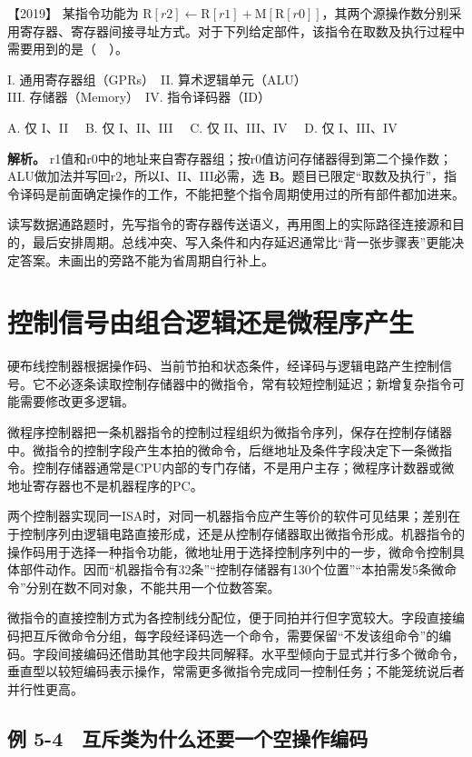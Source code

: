 \noindent{}【2019】 某指令功能为 \(\mathrm R[r2]\leftarrow\mathrm R[r1]+\mathrm M[\mathrm R[r0]]\)，其两个源操作数分别采用寄存器、寄存器间接寻址方式。对于下列给定部件，该指令在取数及执行过程中需要用到的是（　）。

I. 通用寄存器组（GPRs）　II. 算术逻辑单元（ALU）\\
III. 存储器（Memory）　IV. 指令译码器（ID）

A. 仅 I、II　 B. 仅 I、II、III　 C. 仅 II、III、IV　 D. 仅 I、III、IV


\textbf{解析。} r1值和r0中的地址来自寄存器组；按r0值访问存储器得到第二个操作数；ALU做加法并写回r2，所以I、II、III必需，选 \textbf{B}。题目已限定``取数及执行''，指令译码是前面确定操作的工作，不能把整个指令周期使用过的所有部件都加进来。

读写数据通路题时，先写指令的寄存器传送语义，再用图上的实际路径连接源和目的，最后安排周期。总线冲突、写入条件和内存延迟通常比``背一张步骤表''更能决定答案。未画出的旁路不能为省周期自行补上。

\section{控制信号由组合逻辑还是微程序产生}\label{co-05-04}

硬布线控制器根据操作码、当前节拍和状态条件，经译码与逻辑电路产生控制信号。它不必逐条读取控制存储器中的微指令，常有较短控制延迟；新增复杂指令可能需要修改更多逻辑。

微程序控制器把一条机器指令的控制过程组织为微指令序列，保存在控制存储器中。微指令的控制字段产生本拍的微命令，后继地址及条件字段决定下一条微指令。控制存储器通常是CPU内部的专门存储，不是用户主存；微程序计数器或微地址寄存器也不是机器程序的PC。

两个控制器实现同一ISA时，对同一机器指令应产生等价的软件可见结果；差别在于控制序列由逻辑电路直接形成，还是从控制存储器取出微指令形成。机器指令的操作码用于选择一种指令功能，微地址用于选择控制序列中的一步，微命令控制具体部件动作。因而``机器指令有32条''``控制存储器有130个位置''``本拍需发5条微命令''分别在数不同对象，不能共用一个位数答案。

微指令的直接控制方式为各控制线分配位，便于同拍并行但字宽较大。字段直接编码把互斥微命令分组，每字段经译码选一个命令，需要保留``不发该组命令''的编码。字段间接编码还借助其他字段共同解释。水平型倾向于显式并行多个微命令，垂直型以较短编码表示操作，常需更多微指令完成同一控制任务；不能笼统说后者并行性更高。

\subsection{例 5-4　互斥类为什么还要一个空操作编码}\label{co-ex5-4}

